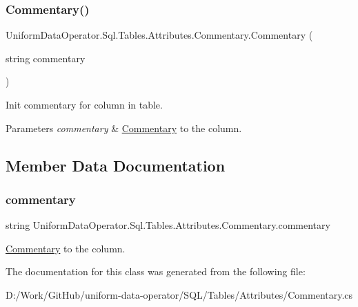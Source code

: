 \subsubsection{\texorpdfstring{Commentary()}{Commentary()}}
{\footnotesize\ttfamily Uniform\+Data\+Operator.\+Sql.\+Tables.\+Attributes.\+Commentary.\+Commentary (\begin{DoxyParamCaption}\item[{string}]{commentary }\end{DoxyParamCaption})}



Init commentary for column in table. 


\begin{DoxyParams}{Parameters}
{\em commentary} & \mbox{\hyperlink{class_uniform_data_operator_1_1_sql_1_1_tables_1_1_attributes_1_1_commentary}{Commentary}} to the column.\\
\hline
\end{DoxyParams}


\subsection{Member Data Documentation}
\mbox{\label{class_uniform_data_operator_1_1_sql_1_1_tables_1_1_attributes_1_1_commentary_ae5b1dba615a813beddea425d35297e54}} 
\subsubsection{\texorpdfstring{commentary}{commentary}}
{\footnotesize\ttfamily string Uniform\+Data\+Operator.\+Sql.\+Tables.\+Attributes.\+Commentary.\+commentary\hspace{0.3cm}{\ttfamily [protected]}}



\mbox{\hyperlink{class_uniform_data_operator_1_1_sql_1_1_tables_1_1_attributes_1_1_commentary}{Commentary}} to the column. 



The documentation for this class was generated from the following file\+:\begin{DoxyCompactItemize}
\item 
D\+:/\+Work/\+Git\+Hub/uniform-\/data-\/operator/\+S\+Q\+L/\+Tables/\+Attributes/Commentary.\+cs\end{DoxyCompactItemize}
